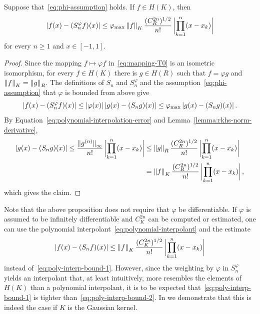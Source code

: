 \documentclass{mcom-l}
\numberwithin{equation}{section}
\numberwithin{theorem}{section} %
\begin{document}
\begin{proposition} \label{prop:poly-interp-bound}
  Suppose that~\eqref{eq:phi-assumption} holds.
  If $f \in H(K)$, then
  \begin{equation} \label{eq:poly-interp-bound-1}
    \abs[0]{ f(x) - (S_{n}^\varphi f)(x) } \leq \varphi_{\max} \norm[0]{f}_K \frac{(C_{R}^{2n})^{1/2}}{n!} \, \abs[3]{ \prod_{k=1}^n (x - x_k) }
  \end{equation}
  for every $n \geq 1$ and $x \in [-1, 1]$.
\end{proposition}
\begin{proof}
  Since the mapping $f \mapsto \varphi f$ in~\eqref{eq:mapping-T0} is an isometric isomorphism, for every $f \in H(K)$ there is $g \in H(R)$ such that $f = \varphi g$ and $\norm[0]{f}_K = \norm[0]{g}_{R}$.
  The definitions of $S_{n}$ and $S_{n}^\varphi$ and the assumption~\eqref{eq:phi-assumption} that $\varphi$ is bounded from above give
  \begin{equation*}
    \abs[0]{ f(x) - (S_{n}^\varphi f)(x) } \leq \abs[0]{\varphi(x)} \abs[0]{ g(x) - (S_{n} g)(x) } \leq \varphi_{\max} \abs[0]{ g(x) - (S_{n} g)(x) }.
  \end{equation*}
  By Equation~\eqref{eq:polynomial-interpolation-error} and Lemma~\ref{lemma:rkhs-norm-derivative},
  \begin{equation*}
    \begin{split}
    \abs[0]{ g(x) - (S_{n} g)(x) } \leq \frac{\norm[0]{g^{(n)}}_\infty}{n!} \, \abs[3]{ \prod_{k=1}^n (x - x_k) } &\leq \norm[0]{g}_{R} \frac{(C_{R}^{2n})^{1/2}}{n!} \, \abs[3]{ \prod_{k=1}^n (x - x_k) } \\
    &= \norm[0]{f}_{K} \frac{(C_{R}^{2n})^{1/2}}{n!} \, \abs[3]{ \prod_{k=1}^n (x - x_k) },
    \end{split}
  \end{equation*}
  which gives the claim.
\end{proof}

Note that the above proposition does not require that $\varphi$ be differentiable.
If $\varphi$ is assumed to be infinitely differentiable and $C_K^{2n}$ can be computed or estimated, one can use the polynomial interpolant~\eqref{eq:polynomial-interpolant} and the estimate
\begin{equation} \label{eq:poly-interp-bound-2}
  \abs[0]{ f(x) - (S_{n} f)(x) } \leq \norm[0]{f}_K \frac{(C_{K}^{2n})^{1/2}}{n!} \, \abs[3]{ \prod_{k=1}^n (x - x_k) }
\end{equation}
instead of~\eqref{eq:poly-interp-bound-1}.
However, since the weighting by $\varphi$ in $S_n^\varphi$ yields an interpolant that, at least intuitively, more resembles the elements of $H(K)$ than a polynomial interpolant, it is to be expected that~\eqref{eq:poly-interp-bound-1} is tighter than~\eqref{eq:poly-interp-bound-2}.
In  we demonstrate that this is indeed the case if $K$ is the Gaussian kernel.
\end{document}
